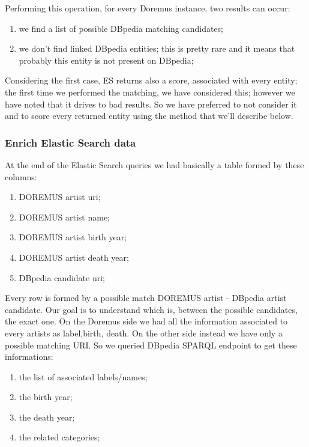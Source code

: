 \documentclass[paper=a4, fontsize=11pt]{scrartcl}
\begin{document}
Performing this operation, for every Doremus instance, two results can occur:

\begin{enumerate}
\item we find a list of possible DBpedia matching candidates;
\item we don't find linked DBpedia entities; this is pretty rare and it means that probably this entity is not present on DBpedia;
\end{enumerate}

Considering the first case, ES returns also a score, associated with every entity; the first time we performed the matching, we have considered this; however we have noted that it drives to bad results. So we have preferred to not consider it and to score every returned entity using the method that we'll describe below.

\subsubsection{Enrich Elastic Search data}

At the end of the Elastic Search queries we had basically a table formed by these columns:

\begin{enumerate}

\item DOREMUS artist uri;

\item DOREMUS artist name;

\item DOREMUS artist birth year;

\item DOREMUS artist death year;

\item DBpedia candidate uri;

\end{enumerate}

Every row is formed by a possible match DOREMUS artist - DBpedia artist candidate.
Our goal is to understand which is, between the possible candidates, the exact one.
On the Doremus side we had all the information associated to every artists as label,birth, death. On the other side instead we have only a possible matching URI. So we queried DBpedia SPARQL endpoint to get these informations:

\begin{enumerate}

\item the list of associated labels/names;

\item the birth year;

\item the death year;

\item the related categories;

\end{enumerate}
\end{document}
